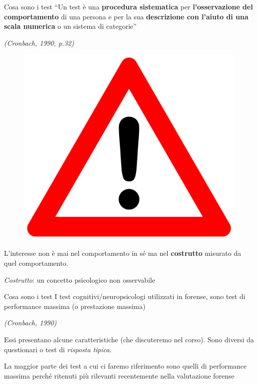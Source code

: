 \documentclass[
  ignorenonframetext,
]{beamer}
\begin{document}
\begin{frame}{Cosa sono i test}
\label{cosa-sono-i-test}
``Un test è una \textbf{procedura sistematica} per
\textbf{l’osservazione del comportamento} di una persona e per la sua
\textbf{descrizione con l’aiuto di una scala numerica} o un sistema di
categorie''

\begin{flushright}
  \emph{(Cronbach, 1990, p.32)}
\end{flushright}
\pause

\begin{flushright}
  \begin{figure}
    \includegraphics[scale=0.05]{Figures/triangle.png}
  \end{figure}
\end{flushright}

L'interesse non è mai nel comportamento in sé ma nel \textbf{costrutto}
misurato da quel comportamento. \pause

\emph{Costrutto}: un concetto psicologico non osservabile
\end{frame}

\begin{frame}{Cosa sono i test}
\label{cosa-sono-i-test-1}
I test cognitivi/neuropsicologi utilizzati in forense, sono test di
performance massima (o prestazione massima)

\begin{flushright}
  \emph{(Cronbach, 1990)}
\end{flushright}
\pause
\vspace{2em}

Essi presentano alcune caratteristiche (che discuteremo nel corso). Sono
diversi da questionari o test di \emph{risposta tipica}. \pause
\vspace{2em}

\begin{center}
La maggior parte dei test a cui ci faremo riferimento sono quelli di performance massima perché ritenuti più rilevanti recentemente nella valutazione forense
\end{center}
\end{frame}
\end{document}
